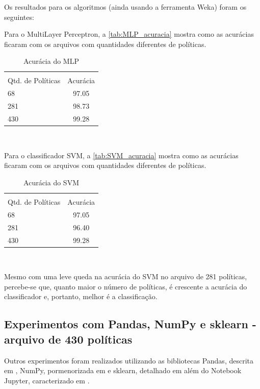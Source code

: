 Os resultados para os algoritmos (ainda usando a ferramenta Weka) foram os seguintes:

Para o MultiLayer Perceptron, a \autoref{tab:MLP_acuracia} mostra como as acurácias ficaram com os arquivos com quantidades diferentes de políticas.

\begin{table}[h!]
	\centering
	\caption{Acurácia do MLP}
	\label{tab:MLP_acuracia}
	\vspace{0.3cm}
	\begin{tabular}{p{6cm}c}
		\hline\\
		Qtd. de Políticas	& Acurácia  \\[10pt] 
		\hline
		68 					& 97.05    	\\
		281			     	& 98.73     \\
		430					& 99.28		\\
		\hline
	\end{tabular}
	\\[6pt]		
\end{table}

Para o classificador SVM, a \autoref{tab:SVM_acuracia} mostra como as acurácias ficaram com os arquivos com quantidades diferentes de políticas.

\begin{table}[h!]
	\centering
	\caption{Acurácia do SVM}
	\label{tab:SVM_acuracia}
	\vspace{0.3cm}
	\begin{tabular}{p{6cm}c}
		\hline\\
		Qtd. de Políticas	& Acurácia  \\[10pt] 
		\hline
		68 					& 97.05    	\\
		281		     	& 96.40     \\
		430					& 99.28		\\
		\hline
	\end{tabular}
	\\[6pt]		
\end{table}

Mesmo com uma leve queda na acurácia do SVM no arquivo de 281 políticas, percebe-se que, quanto maior o número de políticas, é crescente a acurácia do classificador e, portanto, melhor é a classificação.

\subsection{Experimentos com Pandas, NumPy e sklearn - arquivo de 430 políticas}\label{exp:pandas-numpy-sklearn}
Outros experimentos foram realizados utilizando as bibliotecas Pandas, descrita em , NumPy, pormenorizada em  e sklearn, detalhado em  além do Notebook Jupyter, caracterizado em . 

